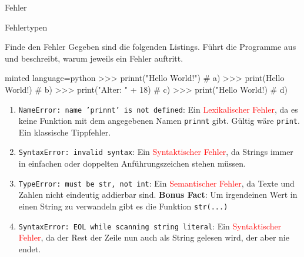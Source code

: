 \begin{task}[points=auto]{Fehler}
\begin{subtask*}[points=0]{Fehlertypen }
\begin{solution}
        \end{solution}
    \end{subtask*}
    \begin{subtask*}[points=0]{Finde den Fehler }
        Gegeben sind die folgenden Listings. Führt die Programme aus und beschreibt, warum jeweils ein Fehler auftritt.
        \begin{codeBlock}[]{minted language=python}
            >>> prinnt("Hello World!") # a)
            >>> print(Hello World!)    # b)
            >>> print("Alter: " + 18)  # c)
            >>> print("Hello World!)   # d)
        \end{codeBlock}
        \begin{solution}
            \begin{enumerate}
                \item \texttt{NameError: name 'prinnt' is not defined}: Ein \textcolor{red}{Lexikalischer Fehler}, da es keine Funktion mit dem angegebenen Namen
                    \texttt	{prinnt} gibt. Gültig wäre \texttt{print}. Ein klassische Tippfehler.
                \item \texttt{SyntaxError: invalid syntax}: Ein \textcolor{red}{Syntaktischer Fehler}, da Strings immer in einfachen oder doppelten Anführungszeichen
                    stehen müssen.
                \item \texttt{TypeError: must be str, not int}: Ein \textcolor{red}{Semantischer Fehler}, da Texte und Zahlen nicht eindeutig addierbar sind.
                    \textbf{Bonus Fact}: Um irgendeinen Wert in einen String zu verwandeln gibt es die Funktion \texttt{str(...)}
                \item \texttt{SyntaxError: EOL while scanning string literal}: Ein \textcolor{red}{Syntaktischer Fehler}, da der Rest der Zeile nun auch als String
                    gelesen wird, der aber nie endet.
            \end{enumerate}

        \end{solution}
    \end{subtask*}
\end{task}
